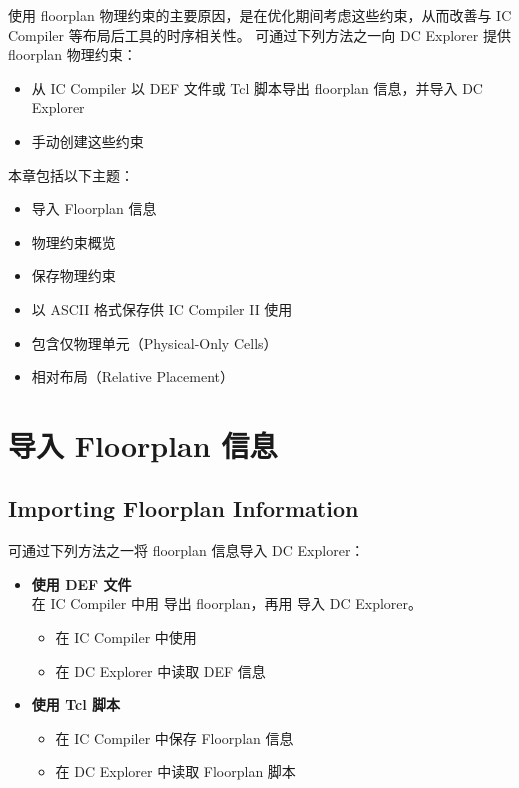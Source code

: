 \label{chap:floorplan}

使用 floorplan 物理约束的主要原因，是在优化期间考虑这些约束，从而改善与 IC Compiler 等布局后工具的时序相关性。
可通过下列方法之一向 DC Explorer 提供 floorplan 物理约束：
\begin{itemize}
  \item 从 IC Compiler 以 DEF 文件或 Tcl 脚本导出 floorplan 信息，并导入 DC Explorer
  \item 手动创建这些约束
\end{itemize}

本章包括以下主题：
\begin{itemize}
  \item 导入 Floorplan 信息
  \item 物理约束概览
  \item 保存物理约束
  \item 以 ASCII 格式保存供 IC Compiler II 使用
  \item 包含仅物理单元（Physical-Only Cells）
  \item 相对布局（Relative Placement）
\end{itemize}

\section{导入 Floorplan 信息}
\subsection*{Importing Floorplan Information}

可通过下列方法之一将 floorplan 信息导入 DC Explorer：
\begin{itemize}
  \item \textbf{使用 DEF 文件}\\
        在 IC Compiler 中用  导出 floorplan，再用  导入 DC Explorer。
        \begin{itemize}
          \item 在 IC Compiler 中使用 
          \item 在 DC Explorer 中读取 DEF 信息
        \end{itemize}
  \item \textbf{使用 Tcl 脚本}
        \begin{itemize}
          \item 在 IC Compiler 中保存 Floorplan 信息
          \item 在 DC Explorer 中读取 Floorplan 脚本
        \end{itemize}
\end{itemize}

